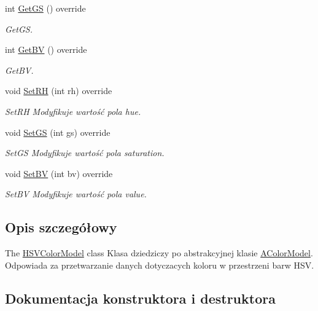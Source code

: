 \begin{DoxyCompactItemize}
int \mbox{\hyperlink{class_h_s_v_color_model_a458ef47bbc34635460fe2d51ddbb858b}{Get\+GS}} () override
\begin{DoxyCompactList}\small\item\em Get\+GS. \end{DoxyCompactList}\item 
int \mbox{\hyperlink{class_h_s_v_color_model_a9365e20ba9a7eeccecc17ef7494b721a}{Get\+BV}} () override
\begin{DoxyCompactList}\small\item\em Get\+BV. \end{DoxyCompactList}\item 
void \mbox{\hyperlink{class_h_s_v_color_model_ae451a6fb2bd74cea52f96810e0140d46}{Set\+RH}} (int rh) override
\begin{DoxyCompactList}\small\item\em Set\+RH Modyfikuje wartość pola hue. \end{DoxyCompactList}\item 
void \mbox{\hyperlink{class_h_s_v_color_model_a3478cc455994e6b0737391e083f1666a}{Set\+GS}} (int gs) override
\begin{DoxyCompactList}\small\item\em Set\+GS Modyfikuje wartość pola saturation. \end{DoxyCompactList}\item 
void \mbox{\hyperlink{class_h_s_v_color_model_a4213b3b016d213e791b97438e62c9c1f}{Set\+BV}} (int bv) override
\begin{DoxyCompactList}\small\item\em Set\+BV Modyfikuje wartość pola value. \end{DoxyCompactList}\end{DoxyCompactItemize}


\subsection{Opis szczegółowy}
The \mbox{\hyperlink{class_h_s_v_color_model}{H\+S\+V\+Color\+Model}} class Klasa dziedziczy po abstrakcyjnej klasie \mbox{\hyperlink{class_a_color_model}{A\+Color\+Model}}. Odpowiada za przetwarzanie danych dotyczacych koloru w przestrzeni barw H\+SV. 

\subsection{Dokumentacja konstruktora i destruktora}
\mbox{\label{class_h_s_v_color_model_a7dac5687cef8207ebc8279414cfa6706}} 
